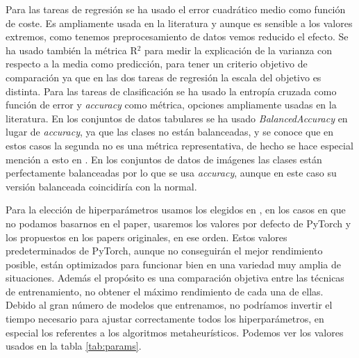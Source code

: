 Para las tareas de regresión se ha usado el error cuadrático medio como función de coste. Es ampliamente usada en la literatura y aunque es sensible a los valores extremos, como tenemos preprocesamiento de datos vemos reducido el efecto. Se ha usado también la métrica R$^2$ para medir la explicación de la varianza con respecto a la media como predicción, para tener un criterio objetivo de comparación ya que en las dos tareas de regresión la escala del objetivo es distinta. Para las tareas de clasificación se ha usado la entropía cruzada como función de error y \textit{accuracy} como métrica, opciones ampliamente usadas en la literatura. En los conjuntos de datos tabulares se ha usado \textit{BalancedAccuracy} en lugar de \textit{accuracy}, ya que las clases no están balanceadas, y se conoce que en estos casos la segunda no es una métrica representativa, de hecho se hace especial mención a esto en \cite{MHtrainingClase}. En los conjuntos de datos de imágenes las clases están perfectamente balanceadas por lo que se usa \textit{accuracy}, aunque en este caso su versión balanceada coincidiría con la normal.

Para la elección de hiperparámetros usamos los elegidos en \cite{MHtrainingClase}, en los casos en que no podamos basarnos en el paper, usaremos los valores por defecto de PyTorch y los propuestos en los papers originales, en ese orden. Estos valores predeterminados de PyTorch, aunque no conseguirán el mejor rendimiento posible, están optimizados para funcionar bien en una variedad muy amplia de situaciones. Además el propósito es una comparación objetiva entre las técnicas de entrenamiento, no obtener el máximo rendimiento de cada una de ellas. Debido al gran número de modelos que entrenamos, no podríamos invertir el tiempo necesario para ajustar correctamente todos los hiperparámetros, en especial los referentes a los algoritmos metaheurísticos. Podemos ver los valores usados en la tabla \ref{tab:params}.

